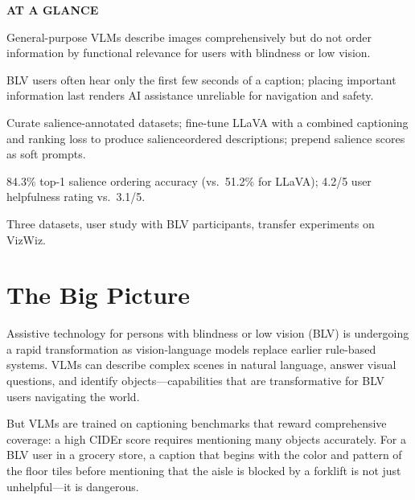 \documentclass[10pt,twocolumn]{article}
\begin{document}
\begin{mdframed}[backgroundcolor=boxgray,linecolor=rulered,linewidth=1pt,
    innerleftmargin=6pt,innerrightmargin=6pt,
    innertopmargin=6pt,innerbottommargin=6pt]
\textbf{\small AT A GLANCE}\par\vspace{4pt}
\begin{description}[leftmargin=0pt,labelsep=4pt,itemsep=2pt,parsep=0pt,
    font=\small\bfseries]
  \item[Problem:] General-purpose VLMs describe images comprehensively
    but do not order information by functional relevance for users with
    blindness or low vision.
  \item[Why it matters:] BLV users often hear only the first few seconds
    of a caption; placing important information last renders AI assistance
    unreliable for navigation and safety.
  \item[Method:] Curate salience-annotated datasets; fine-tune LLaVA
    with a combined captioning and ranking loss to produce salienceordered
    descriptions; prepend salience scores as soft prompts.
  \item[Result:] 84.3\% top-1 salience ordering accuracy (vs.\ 51.2\%
    for LLaVA); 4.2/5 user helpfulness rating vs.\ 3.1/5.
  \item[Evidence:] Three datasets, user study with BLV participants,
    transfer experiments on VizWiz.
\end{description}
\end{mdframed}

\section{The Big Picture}

Assistive technology for persons with blindness or low vision (BLV) is
undergoing a rapid transformation as vision-language models replace
earlier rule-based systems. VLMs can describe complex scenes in natural
language, answer visual questions, and identify objects---capabilities
that are transformative for BLV users navigating the world.

But VLMs are trained on captioning benchmarks that reward comprehensive
coverage: a high CIDEr score requires mentioning many objects accurately.
For a BLV user in a grocery store, a caption that begins with the color
and pattern of the floor tiles before mentioning that the aisle is blocked
by a forklift is not just unhelpful---it is dangerous.
\end{document}
